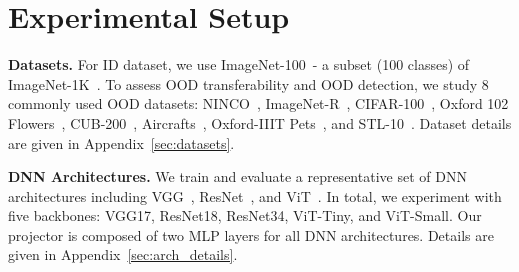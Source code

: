 \section{Experimental Setup}
\label{sec:exp_setting}

%





\noindent
\textbf{Datasets.}
For ID dataset, we use ImageNet-100~\cite{tian2020contrastive}- a subset (100 classes) of ImageNet-1K~\cite{russakovsky2015imagenet}. 
To assess OOD transferability and OOD detection, we study 8 commonly used OOD datasets: NINCO~\cite{bitterwolf2023ninco}, ImageNet-R~\citep{hendrycks2021many}, CIFAR-100~\cite{krizhevsky2014cifar}, Oxford 102 Flowers~\citep{nilsback2008automated}, CUB-200~\citep{wah2011caltech}, Aircrafts~\citep{maji2013fine}, Oxford-IIIT Pets~\citep{parkhi2012cats}, and STL-10~\citep{coates2011analysis}. %
Dataset details are given in Appendix~\ref{sec:datasets}.


\noindent
\textbf{DNN Architectures.}
We train and evaluate a representative set of DNN architectures including VGG~\cite{Simonyan15}, ResNet~\cite{he2016deep}, and ViT~\cite{dosovitskiy2020image}. 
In total, we experiment with five backbones: VGG17, ResNet18, ResNet34, ViT-Tiny, and ViT-Small.
Our projector is composed of two MLP layers for all DNN architectures. %
Details are given in Appendix~\ref{sec:arch_details}.


